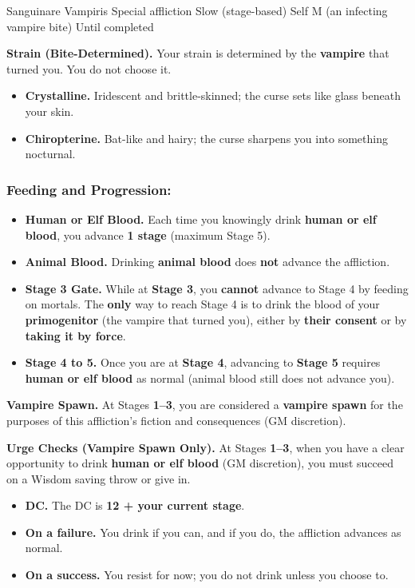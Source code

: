 \documentclass{apotheosis-book}
\begin{document}
\DndSpellHeader%
  {Sanguinare Vampiris}
  {Special affliction}
  {Slow (stage-based)}
  {Self}
  {M (an infecting vampire bite)}
  {Until completed}

\textbf{Strain (Bite-Determined).} Your strain is determined by the \textbf{vampire} that turned you. You do not choose it.
\begin{itemize}
\item \textbf{Crystalline.} Iridescent and brittle-skinned; the curse sets like glass beneath your skin.
\item \textbf{Chiropterine.} Bat-like and hairy; the curse sharpens you into something nocturnal.
\end{itemize}

\subsubsection{Feeding and Progression:}
\begin{itemize}
\item \textbf{Human or Elf Blood.} Each time you knowingly drink \textbf{human or elf blood}, you advance \textbf{1 stage} (maximum Stage 5).
\item \textbf{Animal Blood.} Drinking \textbf{animal blood} does \textbf{not} advance the affliction.
\item \textbf{Stage 3 Gate.} While at \textbf{Stage 3}, you \textbf{cannot} advance to Stage 4 by feeding on mortals. The \textbf{only} way to reach Stage 4 is to drink the blood of your \textbf{primogenitor} (the vampire that turned you), either by \textbf{their consent} or by \textbf{taking it by force}.
\item \textbf{Stage 4 to 5.} Once you are at \textbf{Stage 4}, advancing to \textbf{Stage 5} requires \textbf{human or elf blood} as normal (animal blood still does not advance you).
\end{itemize}

\textbf{Vampire Spawn.} At Stages \textbf{1--3}, you are considered a \textbf{vampire spawn} for the purposes of this affliction's fiction and consequences (GM discretion).

\textbf{Urge Checks (Vampire Spawn Only).} At Stages \textbf{1--3}, when you have a clear opportunity to drink \textbf{human or elf blood} (GM discretion), you must succeed on a Wisdom saving throw or give in.
\begin{itemize}
\item \textbf{DC.} The DC is \textbf{12 + your current stage}.
\item \textbf{On a failure.} You drink if you can, and if you do, the affliction advances as normal.
\item \textbf{On a success.} You resist for now; you do not drink unless you choose to.
\end{itemize}
\end{document}
